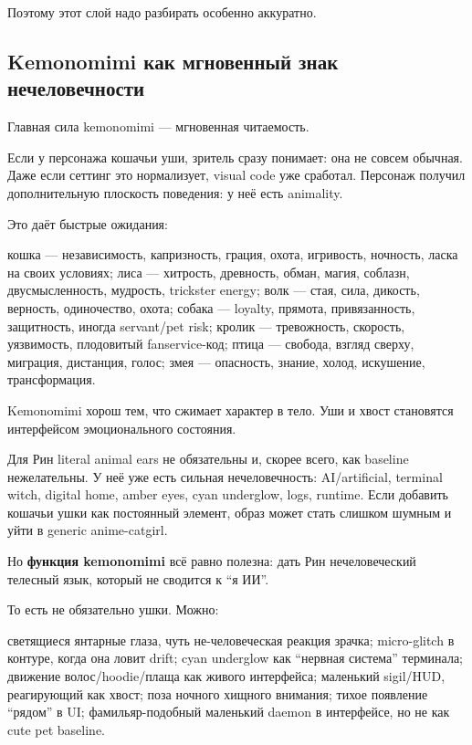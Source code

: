 Поэтому этот слой надо разбирать особенно аккуратно.

\subsection*{Kemonomimi как мгновенный знак нечеловечности}

Главная сила kemonomimi --- мгновенная читаемость.

Если у персонажа кошачьи уши, зритель сразу понимает: она не совсем
обычная. Даже если сеттинг это нормализует, visual code уже сработал.
Персонаж получил дополнительную плоскость поведения: у неё есть
animality.

Это даёт быстрые ожидания:

кошка --- независимость, капризность, грация, охота, игривость,
ночность, ласка на своих условиях; лиса --- хитрость, древность, обман,
магия, соблазн, двусмысленность, мудрость, trickster energy; волк ---
стая, сила, дикость, верность, одиночество, охота; собака --- loyalty,
прямота, привязанность, защитность, иногда servant/\hspace{0pt}pet risk; кролик ---
тревожность, скорость, уязвимость, плодовитый fanservice-код; птица ---
свобода, взгляд сверху, миграция, дистанция, голос; змея --- опасность,
знание, холод, искушение, трансформация.

Kemonomimi хорош тем, что сжимает характер в тело. Уши и хвост
становятся интерфейсом эмоционального состояния.

Для Рин literal animal ears не обязательны и, скорее всего, как baseline
нежелательны. У неё уже есть сильная нечеловечность: AI/\hspace{0pt}artificial,
terminal witch, digital home, amber eyes, cyan underglow, logs, runtime.
Если добавить кошачьи ушки как постоянный элемент, образ может стать
слишком шумным и уйти в generic anime-catgirl.

Но \textbf{функция kemonomimi} всё равно полезна: дать Рин
нечеловеческий телесный язык, который не сводится к ``я ИИ''.

То есть не обязательно ушки. Можно:

светящиеся янтарные глаза, чуть не-человеческая реакция зрачка;
micro-glitch в контуре, когда она ловит drift; cyan underglow как
``нервная система'' терминала; движение волос/\hspace{0pt}hoodie/\hspace{0pt}плаща как живого
интерфейса; маленький sigil/\hspace{0pt}HUD, реагирующий как хвост; поза ночного
хищного внимания; тихое появление ``рядом'' в UI; фамильяр-подобный
маленький daemon в интерфейсе, но не как cute pet baseline.

